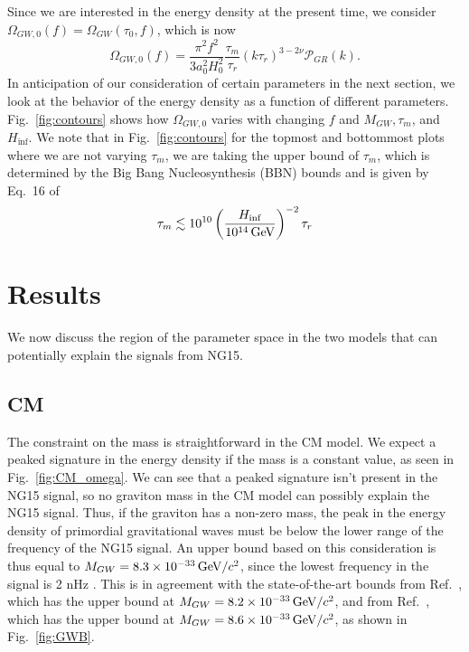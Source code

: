 \documentclass[prd,twocolumn,aps,psfig,nofootinbib,nobibnotes,superscriptaddress,preprintnumbers,times]{revtex4-2}
\newcommand{\GeV}{\,{\rm GeV}}
\begin{document}
Since we are interested in the energy density at the present time, we consider $\Omega_{GW,0}(f) = \Omega_{GW}(\tau_0,f)$, which is now
\begin{equation}\label{eqn:25}
    \Omega_{GW,0}(f) = \frac{\pi^2f^2}{3a_0^2 H_0^2}\frac{\tau_m}{\tau_r}(k\tau_r)^{3-2\nu}\mathcal{P}_{GR}(k) .
\end{equation}
In anticipation of our consideration of certain parameters in the next section, we look at the behavior of the energy density as a function of different parameters. Fig.\ \ref{fig:contours} shows how $\Omega_{GW,0}$ varies with changing $f$ and $M_{GW}, \tau_m$, and $H_{\inf}$. We note that in Fig.\ \ref{fig:contours} for the topmost and bottommost plots where we are not varying $\tau_m$, we are taking the upper bound of $\tau_m$, which is determined by the Big Bang Nucleosynthesis (BBN) bounds and is given by Eq.\ 16 of \cite{Fujita:2018}
\begin{equation}\label{eqn:26}
    \tau_m \lesssim 10^{10}\left(\frac{H_{\inf}}{10^{14} \GeV}\right)^{-2}\tau_r
\end{equation}

\section{Results}
We now discuss the region of the parameter space in the two models that can potentially explain the signals from NG15. 

\subsection{CM}

The constraint on the mass is straightforward in the CM model. We expect a peaked signature in the energy density if the mass is a constant value, as seen in Fig.\ \ref{fig:CM_omega}. We can see that a peaked signature isn't present in the NG15 signal, so no graviton mass in the CM model can possibly explain the NG15 signal. Thus, if the graviton has a non-zero mass, the peak in the energy density of primordial gravitational waves must be below the lower range of the frequency of the NG15 signal. An upper bound based on this consideration is thus equal to $M_{GW} = 8.3\times10^{-33} \GeV/c^2$, since the lowest frequency in the signal is 2 nHz \cite{Agazie:2023}. This is in agreement with the state-of-the-art bounds from Ref.\ \cite{Wu:2023}, which has the upper bound at $M_{GW} = 8.2\times10^{-33} \GeV/c^2$, and from Ref.\ \cite{Wang:2023}, which has the upper bound at $M_{GW} = 8.6\times10^{-33} \GeV/c^2$, as shown in Fig.\ \ref{fig:GWB}.
\end{document}
